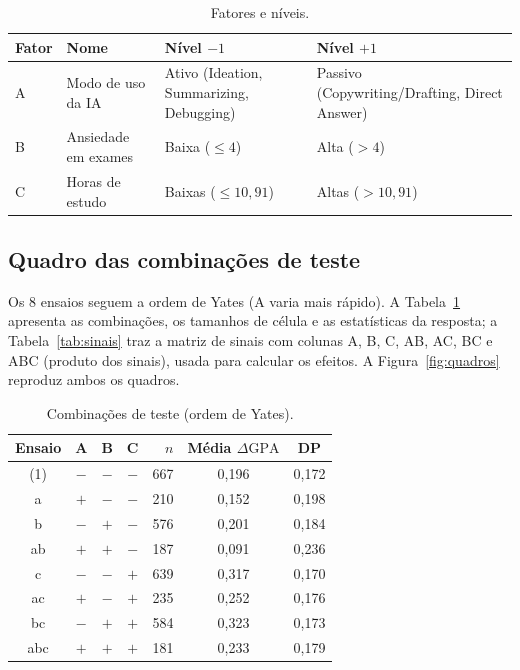 \documentclass[12pt,a4paper]{article}
\newcommand{\dgpa}{\ensuremath{\Delta\mathrm{GPA}}}
\begin{document}
\begin{table}[H]
\centering
\caption{Fatores e n\'iveis.}
\begin{tabular}{llp{5.2cm}p{4cm}}
\toprule
Fator & Nome & N\'ivel $-1$ & N\'ivel $+1$\\
\midrule
A & Modo de uso da IA & Ativo (Ideation, Summarizing, Debugging) & Passivo (Copywriting/Drafting, Direct Answer)\\
B & Ansiedade em exames & Baixa ($\le 4$) & Alta ($>4$)\\
C & Horas de estudo & Baixas ($\le 10{,}91$) & Altas ($>10{,}91$)\\
\bottomrule
\end{tabular}
\end{table}

\subsection{Quadro das combina\c{c}\~oes de teste}
Os 8 ensaios seguem a ordem de Yates (A varia mais r\'apido). A Tabela~\ref{tab:comb} apresenta as combina\c{c}\~oes,
os tamanhos de c\'elula e as estat\'isticas da resposta; a Tabela~\ref{tab:sinais} traz a matriz de sinais
com colunas A, B, C, AB, AC, BC e ABC (produto dos sinais), usada para calcular os efeitos.
A Figura~\ref{fig:quadros} reproduz ambos os quadros.

\begin{table}[H]
\centering
\caption{Combina\c{c}\~oes de teste (ordem de Yates).}\label{tab:comb}
\begin{tabular}{ccccrcc}
\toprule
Ensaio & A & B & C & $n$ & M\'edia \dgpa{} & DP\\
\midrule
(1) & $-$ & $-$ & $-$ & 667 & 0,196 & 0,172\\
a   & $+$ & $-$ & $-$ & 210 & 0,152 & 0,198\\
b   & $-$ & $+$ & $-$ & 576 & 0,201 & 0,184\\
ab  & $+$ & $+$ & $-$ & 187 & 0,091 & 0,236\\
c   & $-$ & $-$ & $+$ & 639 & 0,317 & 0,170\\
ac  & $+$ & $-$ & $+$ & 235 & 0,252 & 0,176\\
bc  & $-$ & $+$ & $+$ & 584 & 0,323 & 0,173\\
abc & $+$ & $+$ & $+$ & 181 & 0,233 & 0,179\\
\bottomrule
\end{tabular}
\end{table}
\end{document}
